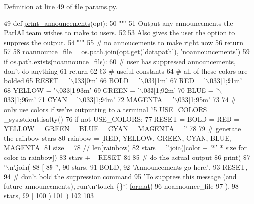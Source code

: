 Definition at line 49 of file params.\+py.


\begin{DoxyCode}
49 \textcolor{keyword}{def }\hyperlink{namespaceparlai_1_1core_1_1params_afd1a47c94990168ea9e70d894a79bd2c}{print\_announcements}(opt):
50     \textcolor{stringliteral}{"""}
51 \textcolor{stringliteral}{    Output any announcements the ParlAI team wishes to make to users.}
52 \textcolor{stringliteral}{}
53 \textcolor{stringliteral}{    Also gives the user the option to suppress the output.}
54 \textcolor{stringliteral}{    """}
55     \textcolor{comment}{# no annoucements to make right now}
56     \textcolor{keywordflow}{return}
57 
58     noannounce\_file = os.path.join(opt.get(\textcolor{stringliteral}{'datapath'}), \textcolor{stringliteral}{'noannouncements'})
59     \textcolor{keywordflow}{if} os.path.exists(noannounce\_file):
60         \textcolor{comment}{# user has suppressed announcements, don't do anything}
61         \textcolor{keywordflow}{return}
62 
63     \textcolor{comment}{# useful constants}
64     \textcolor{comment}{# all of these colors are bolded}
65     RESET = \textcolor{stringliteral}{'\(\backslash\)033[0m'}
66     BOLD = \textcolor{stringliteral}{'\(\backslash\)033[1m'}
67     RED = \textcolor{stringliteral}{'\(\backslash\)033[1;91m'}
68     YELLOW = \textcolor{stringliteral}{'\(\backslash\)033[1;93m'}
69     GREEN = \textcolor{stringliteral}{'\(\backslash\)033[1;92m'}
70     BLUE = \textcolor{stringliteral}{'\(\backslash\)033[1;96m'}
71     CYAN = \textcolor{stringliteral}{'\(\backslash\)033[1;94m'}
72     MAGENTA = \textcolor{stringliteral}{'\(\backslash\)033[1;95m'}
73 
74     \textcolor{comment}{# only use colors if we're outputting to a terminal}
75     USE\_COLORS = \_sys.stdout.isatty()
76     \textcolor{keywordflow}{if} \textcolor{keywordflow}{not} USE\_COLORS:
77         RESET = BOLD = RED = YELLOW = GREEN = BLUE = CYAN = MAGENTA = \textcolor{stringliteral}{''}
78 
79     \textcolor{comment}{# generate the rainbow stars}
80     rainbow = [RED, YELLOW, GREEN, CYAN, BLUE, MAGENTA]
81     size = 78 // len(rainbow)
82     stars = \textcolor{stringliteral}{''}.join([color + \textcolor{stringliteral}{'*'} * size \textcolor{keywordflow}{for} color \textcolor{keywordflow}{in} rainbow])
83     stars += RESET
84 
85     \textcolor{comment}{# do the actual output}
86     print(
87         \textcolor{stringliteral}{'\(\backslash\)n'}.join(
88             [
89                 \textcolor{stringliteral}{''},
90                 stars,
91                 BOLD,
92                 \textcolor{stringliteral}{'Announcements go here.'},
93                 RESET,
94                 \textcolor{comment}{# don't bold the suppression command}
95                 \textcolor{stringliteral}{'To suppress this message (and future announcements), run\(\backslash\)n`touch \{\}`'}.
      \hyperlink{namespaceparlai_1_1chat__service_1_1services_1_1messenger_1_1shared__utils_a32e2e2022b824fbaf80c747160b52a76}{format}(
96                     noannounce\_file
97                 ),
98                 stars,
99             ]
100         )
101     )
102 
103 
\end{DoxyCode}
